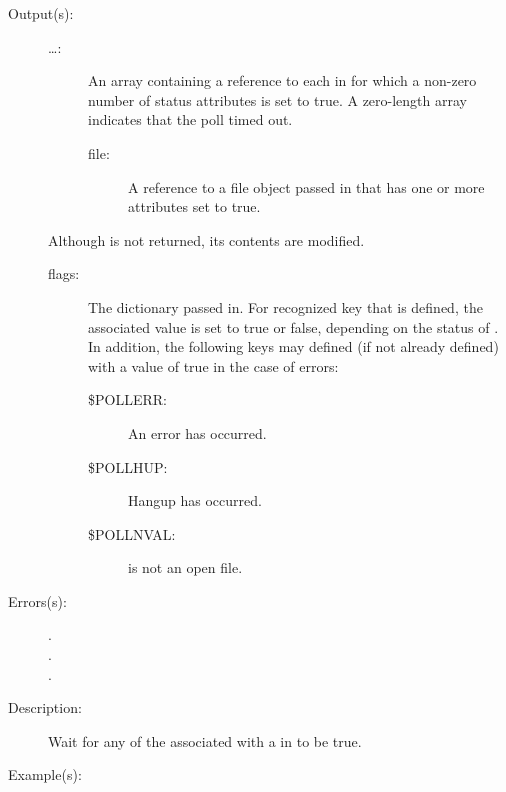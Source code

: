 \begin{description}
\begin{description}
	\item[Output(s): ]
		\begin{description}\item[]
		\item[{\lb}\dots{\rb}: ]
			An array containing a reference to each  in
			\oparg{{\lt}\dots{\gt}} for which a non-zero number of
			status attributes is set to true.  A zero-length array
			indicates that the poll timed out.
			\begin{description}%
			\item[file: ]
				A reference to a file object passed in that has
				one or more attributes set to true.
			\end{description}
		\end{description}
		Although \oparg{{\lt}\dots{\gt}} is not returned, its contents
		are modified.
		\begin{description}\item[]
		\item[flags: ]
			The dictionary passed in.  For recognized key that is
			defined, the associated value is set to true or false,
			depending on the status of .  In addition,
			the following keys may defined (if not already defined)
			with a value of true in the case of errors:
			\begin{description}%
			\item[\$POLLERR: ]
				An error has occurred.
			\item[\$POLLHUP: ]
				Hangup has occurred.
			\item[\$POLLNVAL: ]
				 is not an open file.
			\end{description}
		\end{description}
	\item[Errors(s): ]
		\begin{description}\item[]
		\item[.]
		\item[.]
		\item[.]
		\end{description}
	\item[Description: ]
		Wait for any of the  associated with a 
		in \oparg{{\lt}\dots{\gt}} to be true.
	\item[Example(s): ]\begin{verbatim}


\end{verbatim}
\end{description}
\end{description}
